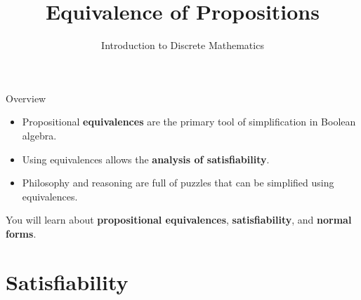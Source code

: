 \documentclass[aspectratio=169]{beamer}
\title{Equivalence of Propositions}
\subtitle{Introduction to Discrete Mathematics}
\author{}
\date{}
\begin{document}
\begin{frame}
  \vspace{1.8cm}
  \titlepage
\end{frame}

\begin{frame}{Overview}
  \begin{itemize}
    \item Propositional \textbf{equivalences} are the primary tool of
          simplification in Boolean algebra.
    \item Using equivalences allows the \textbf{analysis of satisfiability}.
    \item Philosophy and reasoning are full of puzzles that can be simplified
          using equivalences.
  \end{itemize}
  \bigskip
  You will learn about
  \textcolor{dmOrange}{\textbf{propositional equivalences}},
  \textcolor{dmOrange}{\textbf{satisfiability}}, and
  \textcolor{dmOrange}{\textbf{normal forms}}.
\end{frame}

\section{Satisfiability}
\end{document}
